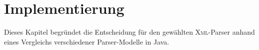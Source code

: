 \chapter{Implementierung}
\label{chap:implementation}


Dieses Kapitel begründet die Entscheidung für den gewählten \textsc{Xml}-Parser anhand eines Vergleichs verschiedener Parser-Modelle in Java.



